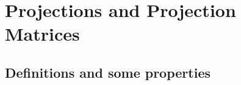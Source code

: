 \documentclass[a4paper, oneside]{book}
\begin{document}

\chapter{Projections and Projection Matrices}


\section*{Definitions and some properties}
\end{document}
